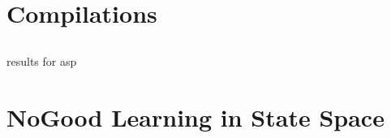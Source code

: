 %

\section[Compilations]{Compilations}
\subsection*{}

\begin{frame}{}

\end{frame}


\begin{frame}{}

results for asp

\end{frame}



%

\section[NoGoods]{NoGood Learning in State Space}
\subsection*{}

\begin{frame}{}

\end{frame}




\section*{}

